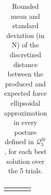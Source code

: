\begin{table}[!ht]
\begin{tabular}{|c|c|c|c|c|c|c|c|c|c|}
    \end{tabular}
    \caption{Rounded mean and standard deviation (in N) of the discretized distance between the produced and expected force ellipsoidal approximation in every posture defined in $\mathcal{Q}_3^{\text{fit}}$, for each best solution over the 5 trials.}
    \label{tab:accuracy_fitting_ellipsoid_p3}
\end{table}
\egroup

\bgroup
\def\arraystretch{1.2}
\begin{table}[!ht]
    \scriptsize
    \centering
    \begin{tabular}{|c|c|c|c|c|c|c|c|c|c|}
    \hline
     & 
     & 
     & 
     \\


\end{tabular}
\end{table}
